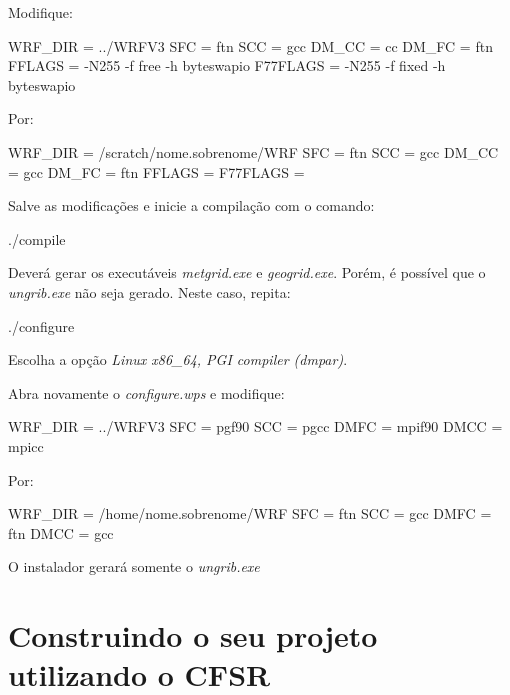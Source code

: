 \noindent Modifique:
\bigskip

\begin{bashcode}
WRF_DIR  = ../WRFV3
SFC      = ftn
SCC      = gcc
DM_CC    = cc
DM_FC    = ftn
FFLAGS   = -N255 -f free -h byteswapio
F77FLAGS = -N255 -f fixed -h byteswapio

\end{bashcode}
\bigskip

\noindent Por:
\bigskip

\begin{bashcode}
WRF_DIR  = /scratch/nome.sobrenome/WRF
SFC      = ftn
SCC      = gcc
DM_CC    = gcc
DM_FC    = ftn
FFLAGS   =
F77FLAGS =
\end{bashcode}
\bigskip

\noindent Salve as modificações e inicie a compilação com o comando:
\bigskip

\begin{bashcode}
./compile
\end{bashcode}
\bigskip

\noindent Deverá gerar os executáveis \textit{metgrid.exe} e \textit{geogrid.exe}. Porém, é possível que o \textit{ungrib.exe} não seja gerado. Neste caso, repita:
\bigskip

\begin{bashcode}
./configure
\end{bashcode}
\bigskip

\noindent Escolha a opção \textit{Linux x86\_64, PGI compiler (dmpar)}.
\bigskip

\noindent Abra novamente o \textit{configure.wps} e modifique:
\bigskip

\begin{bashcode}
WRF_DIR = ../WRFV3
SFC     = pgf90
SCC     = pgcc
DMFC    = mpif90
DMCC    = mpicc
\end{bashcode}
\bigskip

\noindent Por:
\bigskip

\begin{bashcode}
WRF_DIR = /home/nome.sobrenome/WRF
SFC     = ftn
SCC     = gcc
DMFC    = ftn
DMCC    = gcc
\end{bashcode}
\bigskip

\noindent O instalador gerará somente o \textit{ungrib.exe}

\section{Construindo o seu projeto utilizando o CFSR}
\bigskip

